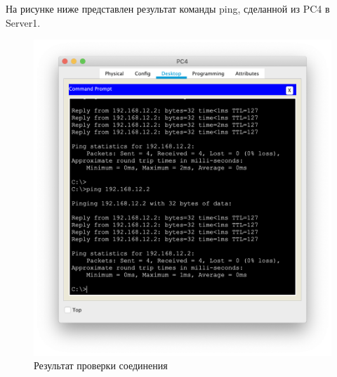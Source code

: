 На рисунке ниже представлен результат команды ping, сделанной из PC4 в Server1.
\begin{figure}[H]
    \centering
    \includegraphics[width=1\textwidth]{images/ping.png}
    \caption{Результат проверки соединения}
    \label{fig:router7}
\end{figure}
